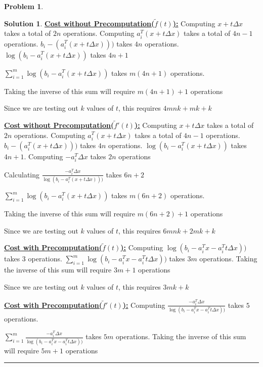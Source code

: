 \documentclass{article}
\theoremstyle{definition}
\newtheorem{problem}{Problem}
\def\fline{\rule{0.75\linewidth}{0.5pt}}
\newcommand{\finishline}{\begin{center}\fline\end{center}}
\newtheorem*{solution*}{Solution}
\newenvironment{solution}{\begin{solution*}}{{\finishline} \end{solution*}}
\begin{document}
\begin{problem}
\begin{enumerate}
\begin{solution}
\textbf{\underline{Cost without Precomputation($\tilde{f}(t)$):}} \newline 
Computing $x + t \Delta x$ takes a total of $2n$ operations. Computing $a_i^T(x + t \Delta x)$ takes a total of $4n - 1$ operations. $b_i - (a_i^T(x + t \Delta x)))$ takes $4n$ operations. $\log{(b_i - a_i^T(x + t \Delta x))}$ takes $4n + 1$  

$\sum_{i=1}^{m} \log{(b_i - a_i^T(x + t \Delta x))}$ takes $m(4n + 1)$ operations. 

Taking the inverse of this sum will require $m(4n + 1) + 1$ operations

Since we are testing out $k$ values of $t$, this requires $4mnk + mk + k$ \newline 

\textbf{\underline{Cost without Precomputation($\tilde{f}'(t)$):}} \newline 
Computing $x + t \Delta x$ takes a total of $2n$ operations. Computing $a_i^T(x + t \Delta x)$ takes a total of $4n - 1$ operations. $b_i - (a_i^T(x + t \Delta x)))$ takes $4n$ operations. $\log{(b_i - a_i^T(x + t \Delta x))}$ takes $4n + 1$. Computing $- a_i^T \Delta x$ takes $2n$ operations

Calculating $\frac{- a_i^T \Delta x}{\log{(b_i - a_i^T(x + t \Delta x)))}}$ takes $6n + 2$

$\sum_{i=1}^{m} \log{(b_i - a_i^T(x + t \Delta x))}$ takes $m(6n + 2)$ operations. 

Taking the inverse of this sum will require $m(6n + 2) + 1$ operations

Since we are testing out $k$ values of $t$, this requires $6mnk + 2mk + k$ \newline 


\textbf{\underline{Cost with Precomputation($\tilde{f}(t)$):}} \newline 
Computing $\log{(b_i - a_i^Tx - a_i^T t \Delta x))}$ takes $3$ operations. $\sum_{i=1}^{m} \log{(b_i - a_i^Tx - a_i^T t \Delta x))}$ takes $3m$ operations. Taking the inverse of this sum will require $3m + 1$ operations

Since we are testing out $k$ values of $t$, this requires $3mk + k$ \newline 

\textbf{\underline{Cost with Precomputation($\tilde{f}'(t)$):}} \newline 
Computing $\frac{- a_i^T \Delta x}{\log{(b_i - a_i^Tx - a_i^T t \Delta x))}}$ takes $5$ operations.

$\sum_{i=1}^{m} \frac{- a_i^T \Delta x}{\log{(b_i - a_i^Tx - a_i^T t \Delta x))}}$ takes $5m$ operations. Taking the inverse of this sum will require $5m + 1$ operations


\end{solution}
\end{enumerate}
\end{problem}
\end{document}
